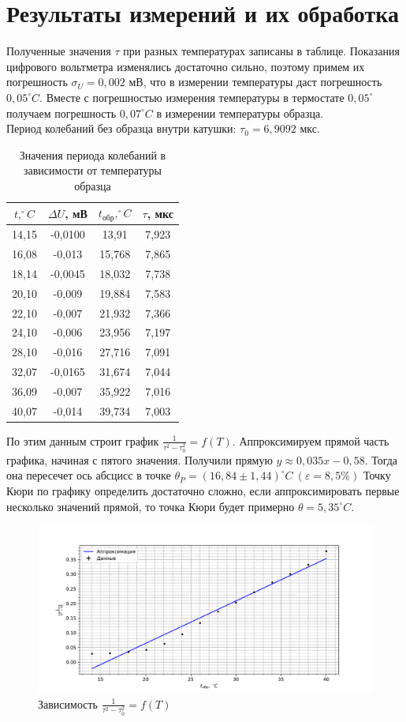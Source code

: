 \documentclass[a4paper, 12pt]{article}
\begin{document}
	\section* {Результаты измерений и их обработка}
	Полученные значения $\tau$ при разных температурах записаны в таблице. Показания цифрового вольтметра изменялись достаточно сильно, поэтому примем их погрешность $\sigma_U = 0,002$ мВ, что в измерении температуры даст погрешность $0,05^{\circ} C$. Вместе с погрешностью измерения температуры в термостате $0,05^{\circ}$ получаем погрешность $0,07^{\circ} C$ в измерении температуры образца.\\
	Период колебаний без образца внутри катушки: $\tau_0 = 6,9092$ мкс.
	\begin{table}[h!]
		\centering
		\begin{tabular}{|c|c|c|c|}
			\hline
			$t, ^{\circ}C$ & $\Delta U$, мВ & $t_{\text{обр}}, ^{\circ} C$ & $\tau$, мкс \\ \hline
			14,15 & -0,0100 & 13,91 & 7,923 \\ \hline
			16,08 & -0,013 & 15,768 & 7,865 \\ \hline
			18,14 & -0,0045 & 18,032 & 7,738 \\ \hline
			20,10 & -0,009 & 19,884 & 7,583 \\ \hline
			22,10 & -0,007 & 21,932 & 7,366 \\ \hline
			24,10 & -0,006 & 23,956 & 7,197 \\ \hline
			28,10 & -0,016 & 27,716 & 7,091 \\ \hline
			32,07 & -0,0165 & 31,674 & 7,044 \\ \hline
			36,09 & -0,007 & 35,922 & 7,016 \\ \hline
			40,07 & -0,014 & 39,734 & 7,003 \\ \hline
		\end{tabular}
		\caption{Значения периода колебаний в зависимости от температуры образца}
	\end{table}

	По этим данным строит график $\frac{1}{\tau^2 - \tau_0^2} = f(T)$. Аппроксимируем прямой часть графика, начиная с пятого значения. Получили прямую $y \approx 0,035x - 0,58$. Тогда она пересечет ось абсцисс в точке $\theta_P = (16,84 \pm 1,44) ^{\circ}C \ (\varepsilon = 8,5\%)$
	Точку Кюри по графику определить достаточно сложно, если аппроксимировать первые несколько значений прямой, то точка Кюри будет примерно $\theta = 5,35^{\circ}C$.
	\begin{figure}[H]
		\centering
		\includegraphics[width = \textwidth]{graph.pdf}
		\caption{Зависимость $\frac{1}{\tau^2 - \tau_0^2} = f(T)$}
	\end{figure}
\end{document}
